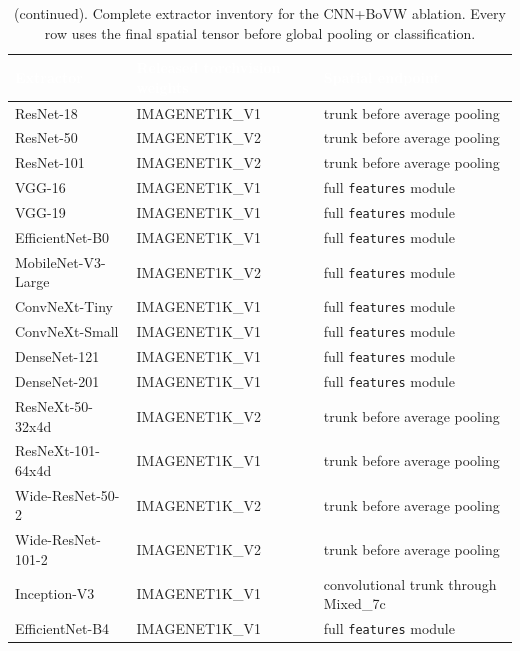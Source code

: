 \documentclass[sn-basic,Numbered]{sn-jnl}
\newcommand{\hd}[1]{\textcolor{white}{\textbf{#1}}}
\begin{document}
\addtocounter{table}{-1}
\renewcommand{\theHtable}{S13-extractors}
\begin{table}[!ht]
\centering
\caption{(continued). Complete extractor inventory for the
CNN+BoVW ablation. Every row uses the final spatial tensor before global
pooling or classification.}
\label{tab:cnn_inventory_supp}
\scriptsize
\setlength{\tabcolsep}{3.2pt}
\renewcommand{\arraystretch}{1.04}
\begin{tabular}{@{}p{2.65cm}p{3.45cm}p{4.35cm}@{}}
\toprule
\rowcolor{headerblue}
\hd{Extractor} & \hd{Released torchvision weights} & \hd{Spatial endpoint} \\
\midrule
ResNet-18 & IMAGENET1K\_V1 & trunk before average pooling \\
\rowcolor{rowlight}ResNet-50 & IMAGENET1K\_V2 & trunk before average pooling \\
ResNet-101 & IMAGENET1K\_V2 & trunk before average pooling \\
\rowcolor{rowlight}VGG-16 & IMAGENET1K\_V1 & full \texttt{features} module \\
VGG-19 & IMAGENET1K\_V1 & full \texttt{features} module \\
\rowcolor{rowlight}EfficientNet-B0 & IMAGENET1K\_V1 & full \texttt{features} module \\
MobileNet-V3-Large & IMAGENET1K\_V2 & full \texttt{features} module \\
\rowcolor{rowlight}ConvNeXt-Tiny & IMAGENET1K\_V1 & full \texttt{features} module \\
ConvNeXt-Small & IMAGENET1K\_V1 & full \texttt{features} module \\
\rowcolor{rowlight}DenseNet-121 & IMAGENET1K\_V1 & full \texttt{features} module \\
DenseNet-201 & IMAGENET1K\_V1 & full \texttt{features} module \\
\rowcolor{rowlight}ResNeXt-50-32x4d & IMAGENET1K\_V2 & trunk before average pooling \\
ResNeXt-101-64x4d & IMAGENET1K\_V1 & trunk before average pooling \\
\rowcolor{rowlight}Wide-ResNet-50-2 & IMAGENET1K\_V2 & trunk before average pooling \\
Wide-ResNet-101-2 & IMAGENET1K\_V2 & trunk before average pooling \\
\rowcolor{rowlight}Inception-V3 & IMAGENET1K\_V1 & convolutional trunk through Mixed\_7c \\
EfficientNet-B4 & IMAGENET1K\_V1 & full \texttt{features} module \\

\end{tabular}
\end{table}
\end{document}
